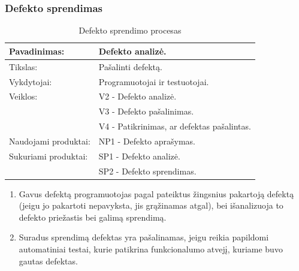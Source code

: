 \documentclass{VUMIFPSkursinis}
\begin{document}
	\subsubsection{Defekto sprendimas}
	\begin{center}
		\begin{table}[ht]
			\caption{Defekto sprendimo procesas}
			\begin{tabular}{ | l | l | }
				\hline
				Pavadinimas:		& Defekto analizė.				\\ \hline
				Tikslas:		& Pašalinti defektą.				\\ \hline
				Vykdytojai:		& Programuotojai ir testuotojai.		\\ \hline
				Veiklos:		& V2 - Defekto analizė.				\\
							& V3 - Defekto pašalinimas.			\\
							& V4 - Patikrinimas, ar defektas pašalintas.	\\ \hline

				Naudojami produktai:	& NP1 - Defekto aprašymas.			\\ \hline
				Sukuriami produktai:	& SP1 - Defekto analizė.			\\
							& SP2 - Defekto sprendimas.			\\ \hline
			\end{tabular}
		\end{table}
	\end{center}
	\begin{enumerate}
		\item Gavus defektą programuotojas pagal pateiktus žingsnius pakartoją defektą (jeigu jo pakartoti nepavyksta, jis grąžinamas atgal), bei išanalizuoja to defekto priežastis bei galimą sprendimą.
		\item Suradus sprendimą defektas yra pašalinamas, jeigu reikia papildomi automatiniai testai, kurie patikrina funkcionalumo atvejį, kuriame buvo gautas defektas.
	\end{enumerate}
\end{document}
